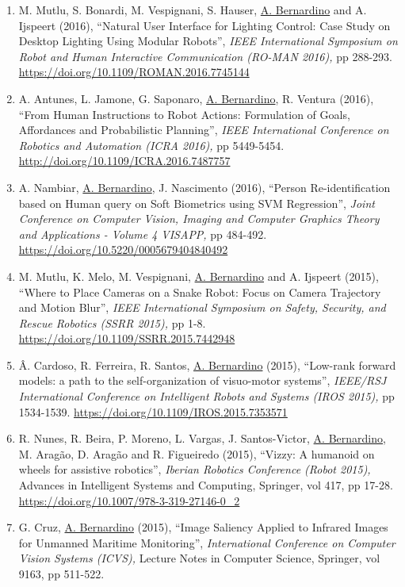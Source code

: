\documentclass[
]{article}
\begin{document}
\begin{enumerate}
  \url{https://doi.org/10.1109/OCEANS.2016.7761019}~
\item
  M. Mutlu, S. Bonardi, M. Vespignani, S. Hauser, \ul{A. Bernardino} and
  A. Ijspeert (2016), ``Natural User Interface for Lighting Control:
  Case Study on Desktop Lighting Using Modular Robots'', \emph{IEEE
  International Symposium on Robot and Human Interactive Communication
  (RO-MAN 2016),} pp 288-293.
  \url{https://doi.org/10.1109/ROMAN.2016.7745144}~
\item
  A. Antunes, L. Jamone, G. Saponaro, \ul{A. Bernardino}, R. Ventura
  (2016), ``From Human Instructions to Robot Actions: Formulation of
  Goals, Affordances and Probabilistic Planning'', \emph{IEEE
  International Conference on Robotics and Automation (ICRA 2016),} pp
  5449-5454. \url{http://doi.org/10.1109/ICRA.2016.7487757}~
\item
  A. Nambiar, \ul{A. Bernardino}, J. Nascimento (2016), ``Person
  Re-identification based on Human query on Soft Biometrics using SVM
  Regression'', \emph{Joint Conference on Computer Vision, Imaging and
  Computer Graphics Theory and Applications - Volume 4 VISAPP,} pp
  484-492. \url{https://doi.org/10.5220/0005679404840492}~
\item
  M. Mutlu, K. Melo, M. Vespignani, \ul{A. Bernardino} and A. Ijspeert
  (2015), ``Where to Place Cameras on a Snake Robot: Focus on Camera
  Trajectory and Motion Blur'', \emph{IEEE International Symposium on
  Safety, Security, and Rescue Robotics (SSRR 2015),} pp 1-8.
  \url{https://doi.org/10.1109/SSRR.2015.7442948}~
\item
  Â. Cardoso, R. Ferreira, R. Santos, \ul{A. Bernardino} (2015),
  ``Low-rank forward models: a path to the self-organization of
  visuo-motor systems'', \emph{IEEE/RSJ International Conference on
  Intelligent Robots and Systems (IROS 2015),} pp 1534-1539.
  \url{https://doi.org/10.1109/IROS.2015.7353571}~
\item
  R. Nunes, R. Beira, P. Moreno, L. Vargas, J. Santos-Victor, \ul{A.
  Bernardino}, M. Aragão, D. Aragão and R. Figueiredo (2015), ``Vizzy: A
  humanoid on wheels for assistive robotics'', \emph{Iberian Robotics
  Conference (Robot 2015),} Advances in Intelligent Systems and
  Computing, Springer, vol 417, pp 17-28.
  \url{https://doi.org/10.1007/978-3-319-27146-0_2}~
\item
  G. Cruz, \ul{A. Bernardino} (2015), ``Image Saliency Applied to
  Infrared Images for Unmanned Maritime Monitoring'',
  \emph{International Conference on Computer Vision Systems (ICVS),}
  Lecture Notes in Computer Science, Springer, vol 9163, pp 511-522.

\end{enumerate}
\end{document}
